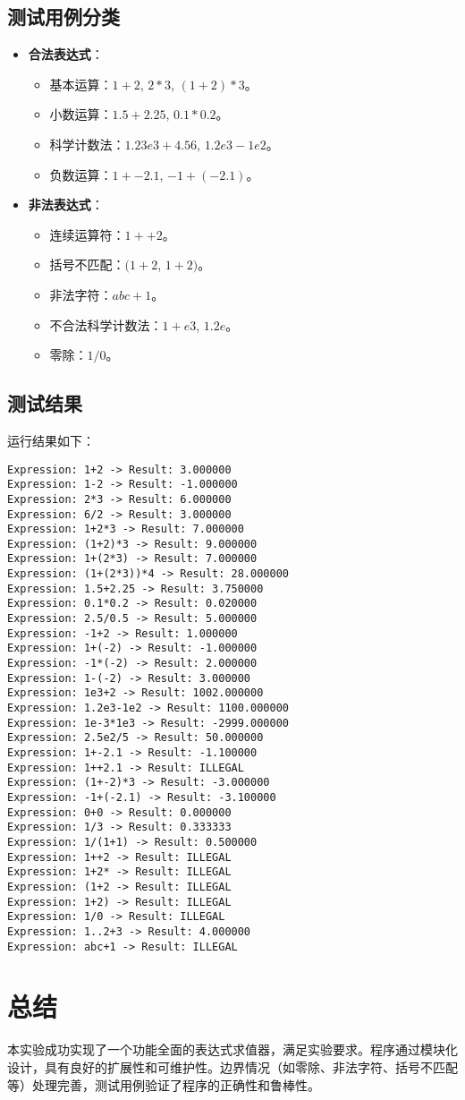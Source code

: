 \documentclass[UTF8]{ctexart}
\begin{document}
\subsection{测试用例分类}
\begin{itemize}
    \item \textbf{合法表达式}：
    \begin{itemize}
        \item 基本运算：$1+2$, $2*3$, $(1+2)*3$。
        \item 小数运算：$1.5+2.25$, $0.1*0.2$。
        \item 科学计数法：$1.23e3+4.56$, $1.2e3-1e2$。
        \item 负数运算：$1+-2.1$, $-1+(-2.1)$。
    \end{itemize}
    \item \textbf{非法表达式}：
    \begin{itemize}
        \item 连续运算符：$1++2$。
        \item 括号不匹配：$(1+2$, $1+2)$。
        \item 非法字符：$abc+1$。
        \item 不合法科学计数法：$1+e3$, $1.2e$。
        \item 零除：$1/0$。
    \end{itemize}
\end{itemize}

\subsection{测试结果}
运行结果如下：
\begin{verbatim}
Expression: 1+2 -> Result: 3.000000
Expression: 1-2 -> Result: -1.000000
Expression: 2*3 -> Result: 6.000000
Expression: 6/2 -> Result: 3.000000
Expression: 1+2*3 -> Result: 7.000000
Expression: (1+2)*3 -> Result: 9.000000
Expression: 1+(2*3) -> Result: 7.000000
Expression: (1+(2*3))*4 -> Result: 28.000000
Expression: 1.5+2.25 -> Result: 3.750000
Expression: 0.1*0.2 -> Result: 0.020000
Expression: 2.5/0.5 -> Result: 5.000000
Expression: -1+2 -> Result: 1.000000
Expression: 1+(-2) -> Result: -1.000000
Expression: -1*(-2) -> Result: 2.000000
Expression: 1-(-2) -> Result: 3.000000
Expression: 1e3+2 -> Result: 1002.000000
Expression: 1.2e3-1e2 -> Result: 1100.000000
Expression: 1e-3*1e3 -> Result: -2999.000000
Expression: 2.5e2/5 -> Result: 50.000000
Expression: 1+-2.1 -> Result: -1.100000
Expression: 1++2.1 -> Result: ILLEGAL
Expression: (1+-2)*3 -> Result: -3.000000
Expression: -1+(-2.1) -> Result: -3.100000
Expression: 0+0 -> Result: 0.000000
Expression: 1/3 -> Result: 0.333333
Expression: 1/(1+1) -> Result: 0.500000
Expression: 1++2 -> Result: ILLEGAL
Expression: 1+2* -> Result: ILLEGAL
Expression: (1+2 -> Result: ILLEGAL
Expression: 1+2) -> Result: ILLEGAL
Expression: 1/0 -> Result: ILLEGAL
Expression: 1..2+3 -> Result: 4.000000
Expression: abc+1 -> Result: ILLEGAL
\end{verbatim}

\section{总结}
本实验成功实现了一个功能全面的表达式求值器，满足实验要求。程序通过模块化设计，具有良好的扩展性和可维护性。边界情况（如零除、非法字符、括号不匹配等）处理完善，测试用例验证了程序的正确性和鲁棒性。
\end{document}

